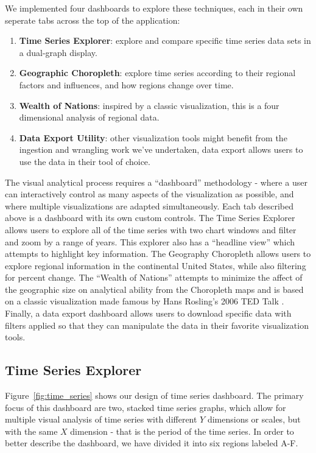 \documentclass{sigchi}
\begin{document}
We implemented four dashboards to explore these techniques, each in their own seperate tabs across the top of the application:

\begin{enumerate}
    \item \textbf{Time Series Explorer}: explore and compare specific time series data sets in a dual-graph display.
    \item \textbf{Geographic Choropleth}: explore time series according to their regional factors and influences, and how regions change over time.
    \item \textbf{Wealth of Nations}: inspired by a classic visualization, this is a four dimensional analysis of regional data.
    \item \textbf{Data Export Utility}: other visualization tools might benefit from the ingestion and wrangling work we've undertaken, data export allows users to use the data in their tool of choice.
\end{enumerate}

The visual analytical process requires a ``dashboard'' methodology - where a user can interactively control as many aspects of the visualization as possible, and where multiple visualizations are adapted simultaneously. Each tab described above is a dashboard with its own custom controls. The Time Series Explorer allows users to explore all of the time series with two chart windows and filter and zoom by a range of years. This explorer also has a ``headline view'' which attempts to highlight key information. The Geography Choropleth allows users to explore regional information in the continental United States, while also filtering for percent change. The ``Wealth of Nations'' attempts to minimize the affect of the geographic size on analytical ability from the Choropleth maps and is based on a classic visualization made famous by Hans Rosling's 2006 TED Talk \cite{_wealth_????}. Finally, a data export dashboard allows users to download specific data with filters applied so that they can manipulate the data in their favorite visualization tools.

\subsection{Time Series Explorer}

Figure~\ref{fig:time_series} shows our design of time series dashboard. The primary focus of this dashboard are two, stacked time series graphs, which allow for multiple visual analysis of time series with different $Y$ dimensions or scales, but with the same $X$ dimension - that is the period of the time series. In order to better describe the dashboard, we have divided it into six regions labeled A-F.
\end{document}
